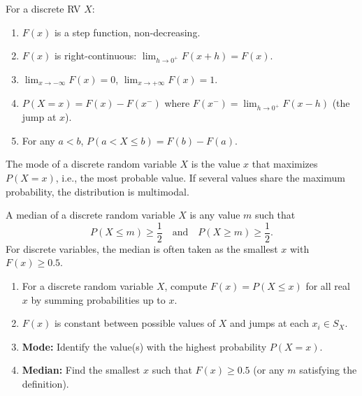 \documentclass[11pt]{article}
\newcommand{\cle}[1]{{\popxbold\color{popdark}#1}}
\begin{document}
\begin{propriete}
For a discrete RV $X$:
\begin{enumerate}
\item $F(x)$ is a step function, non-decreasing.
\item $F(x)$ is right-continuous: $\lim_{h\to 0^+} F(x+h) = F(x)$.
\item $\lim_{x\to -\infty} F(x) = 0$, $\lim_{x\to +\infty} F(x) = 1$.
\item $P(X=x) = F(x) - F(x^-)$ where $F(x^-) = \lim_{h\to 0^+} F(x-h)$ (the jump at $x$).
\item For any $a < b$, $P(a < X \le b) = F(b) - F(a)$.
\end{enumerate}
\end{propriete}

\begin{definition}[Mode]
The \cle{mode} of a discrete random variable $X$ is the value $x$ that maximizes $P(X=x)$, i.e., the most probable value. If several values share the maximum probability, the distribution is \cle{multimodal}.
\end{definition}

\begin{definition}[Median]
A \cle{median} of a discrete random variable $X$ is any value $m$ such that
\[
P(X \le m) \ge \frac12 \quad \text{and} \quad P(X \ge m) \ge \frac12.
\]
For discrete variables, the median is often taken as the smallest $x$ with $F(x) \ge 0.5$.
\end{definition}

\begin{methode}
\begin{enumerate}
\item For a discrete random variable $X$, compute $F(x)=P(X\le x)$ for all real $x$ by summing probabilities up to $x$.
\item $F(x)$ is constant between possible values of $X$ and jumps at each $x_i \in S_X$.
\item \textbf{Mode:} Identify the value(s) with the highest probability $P(X=x)$.
\item \textbf{Median:} Find the smallest $x$ such that $F(x) \ge 0.5$ (or any $m$ satisfying the definition).
\end{enumerate}
\end{methode}
\end{document}
